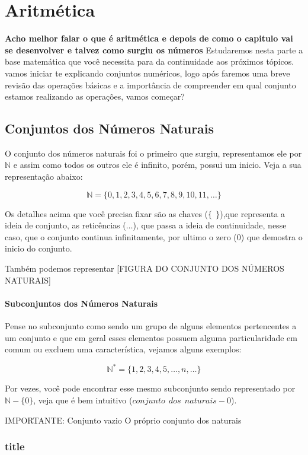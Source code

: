 \chapter{Aritmética}
\textbf{Acho melhor falar o que é aritmética e depois de como o capitulo vai se desenvolver e talvez como surgiu os números}
Estudaremos nesta parte a base matemática que você necessita para da continuidade aos próximos tópicos. vamos iniciar te explicando conjuntos numéricos, logo após faremos uma breve revisão das operações básicas e a importância de compreender em qual conjunto estamos realizando as operações, vamos começar?
\section{Conjuntos dos Números Naturais}
O conjunto dos números naturais foi o primeiro que surgiu, representamos ele por $\mathbb{N}$ e assim como todos os outros ele é infinito, porém, possui um inicio. Veja a sua representação abaixo:

$$ \mathbb{N}= \{0,1,2,3,4,5,6,7,8,9,10,11, \ldots \}$$

Os detalhes acima que você precisa fixar são as chaves ($\{~~ \}$),que representa a ideia de conjunto, as reticências ($\ldots$), que passa a ideia de continuidade, nesse caso, que o conjunto continua infinitamente, por ultimo o zero ($0$) que demostra o inicio do conjunto.

Também podemos representar 
[FIGURA DO CONJUNTO DOS NÚMEROS NATURAIS]

\subsubsection{Subconjuntos dos Números Naturais}
Pense no subconjunto como sendo um grupo de alguns elementos pertencentes a um conjunto e que em geral esses elementos possuem alguma particularidade em comum ou excluem uma característica, vejamos alguns exemplos:

\begin{example}
	$$\mathbb{N}^{*}=\{1,2,3,4,5,\ldots,n,\ldots\}$$
	
	Por vezes, você pode encontrar esse mesmo subconjunto sendo representado por $\mathbb{N}-\{ 0 \}$, veja que é bem intuitivo ($conjunto~~dos~~naturais - 0$).
\end{example}


IMPORTANTE:
Conjunto vazio
O próprio conjunto dos naturais

\subsection{title}

